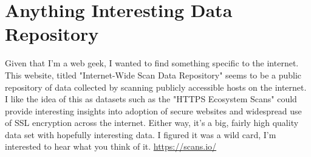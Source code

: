 \section{Anything Interesting Data Repository}
	Given that I'm a web geek, I wanted to find something specific to the internet. This website, titled "Internet-Wide Scan Data Repository" seems to be a public repository of data collected by scanning publicly accessible hosts on the internet. I like the idea of this as datasets such as the "HTTPS Ecosystem Scans" could provide interesting insights into adoption of secure websites and widespread use of SSL encryption across the internet. Either way, it's a big, fairly high quality data set with hopefully interesting data. I figured it was a wild card, I'm interested to hear what you think of it.
	\url{https://scans.io/}
